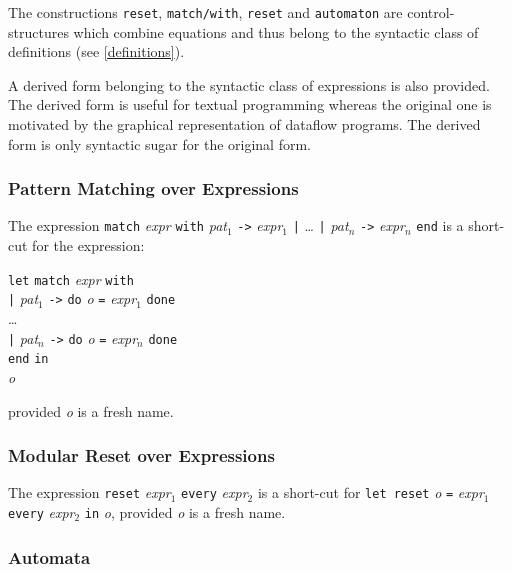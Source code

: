 \documentclass[11pt,titlepage,twoside]{report}
\newcommand{\In}{\mbox{{\tt in}}}
\newcommand{\Minusgreater}{\mbox{{\tt ->}}}
\newcommand{\term}[1]{{\tt #1}}
\newcommand{\nterm}[1]{{\em #1}}
\begin{document}
The constructions \verb-reset-, \verb-match/with-, \verb-reset- and
\verb-automaton- are control-structures which combine equations and
thus belong to the syntactic class of definitions (see
\cref{definitions}).

A derived form belonging to the syntactic class of expressions is also
provided. The derived form is useful for textual programming whereas
the original one is motivated by the graphical representation of
dataflow programs. The derived form is only syntactic sugar for the
original form.

\subsubsection{Pattern Matching over Expressions} %

The expression
\term{match} \nterm{expr} \term{with} 
  \nterm{pat}$_1$ \term{\Minusgreater} \nterm{expr}$_1$ \term{|} \dots 
\term{|} \nterm{pat}$_n$ \term{\Minusgreater} \nterm{expr}$_n$ \term{end}
is a short-cut for the expression:

\begin{center}
\begin{tabbing}
\term{let} \= \term{match} \nterm{expr} \term{with} \\ 
           \> \term{|} \nterm{pat}$_1$ \term{\Minusgreater} 
               \term{do} \nterm{o} \term{=} \nterm{expr}$_1$ \term{done} \\
           \> \dots \\
           \> \term{|} \nterm{pat}$_n$ \term{\Minusgreater} 
               \term{do} \nterm{o} \term{=} \nterm{expr}$_n$ \term{done} \\
           \> \term{end} \In \\
\nterm{o}
\end{tabbing}
\end{center}
provided \nterm{o} is a fresh name.

\subsubsection{Modular Reset over Expressions} %

The expression \term{reset} \nterm{expr}$_1$ \term{every} \nterm{expr}$_2$
is a short-cut for
\term{let reset} \nterm{o} \term{=} \nterm{expr}$_1$ 
\term{every} \nterm{expr}$_2$ \term{in} \nterm{o},
provided \nterm{o} is a fresh name.

\subsubsection{Automata} %
\end{document}
